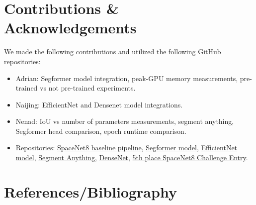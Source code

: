 \documentclass[10pt,twocolumn,letterpaper]{article}
\begin{document}

\section{Contributions \& Acknowledgements}
\label{sec:contributions}

We made the following contributions and utilized the following GitHub repositories:
\begin{itemize}
    \item Adrian: Segformer model integration, peak-GPU memory measurements, pre-trained vs not pre-trained experiments.
    \item Naijing: EfficientNet and Densenet model integrations.
    \item Nenad: IoU vs number of parameters measurements, segment anything, Segformer head comparison, epoch runtime comparison.
    \item Repositories: \href{https://github.com/SpaceNetChallenge/SpaceNet8}{SpaceNet8 baseline pipeline}, \href{https://github.com/huggingface/transformers/releases}{Segformer model}, \href{https://github.com/LovreAB17/Eff-UNet}{EfficientNet model}, \href{https://github.com/facebookresearch/segment-anything}{Segment Anything}, \href{https://github.com/liuzhuang13/DenseNet}{DenseNet}, \href{https://github.com/motokimura/spacenet8_solution_5th-place/tree/main/spacenet8_model/models}{5th place SpaceNet8 Challenge Entry}.
\end{itemize}


\pagebreak
\section{References/Bibliography}
\end{document}
